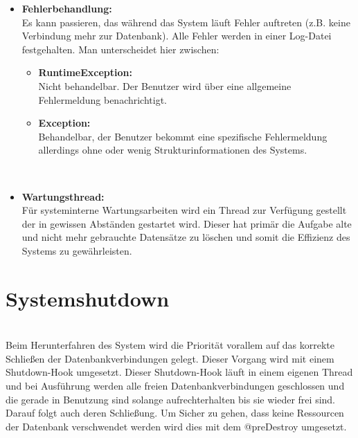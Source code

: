 \begin{itemize}
			\item \textbf{Fehlerbehandlung:} \\
			Es kann passieren, das während das System läuft Fehler auftreten (z.B. keine Verbindung mehr zur Datenbank). Alle Fehler werden in einer Log-Datei festgehalten. Man unterscheidet hier zwischen:
			\begin{itemize}
				\item \textbf{RuntimeException:}\\
				 Nicht behandelbar. Der Benutzer wird über eine allgemeine Fehlermeldung benachrichtigt.
				\item \textbf{Exception:} \\
				Behandelbar, der Benutzer bekommt eine spezifische Fehlermeldung allerdings ohne oder wenig Strukturinformationen des Systems.
				\end{itemize}
			\\	
			\item \textbf{Wartungsthread:} \\
			Für systeminterne Wartungsarbeiten wird ein Thread zur Verfügung gestellt der in gewissen Abständen gestartet wird. Dieser hat primär die Aufgabe alte und nicht mehr gebrauchte Datensätze zu löschen und somit die Effizienz des Systems zu gewährleisten.
		\end{itemize} 
	
\section{Systemshutdown}\\

	Beim Herunterfahren des System wird die Priorität vorallem auf das korrekte Schließen der Datenbankverbindungen gelegt. Dieser Vorgang wird mit einem Shutdown-Hook umgesetzt. Dieser Shutdown-Hook läuft in einem eigenen Thread und bei Ausführung werden alle freien Datenbankverbindungen geschlossen und die gerade in Benutzung sind solange aufrechterhalten bis sie wieder frei sind. Darauf folgt auch deren Schließung. Um Sicher zu gehen, dass keine Ressourcen der Datenbank verschwendet werden wird dies mit dem @preDestroy umgesetzt. 
   